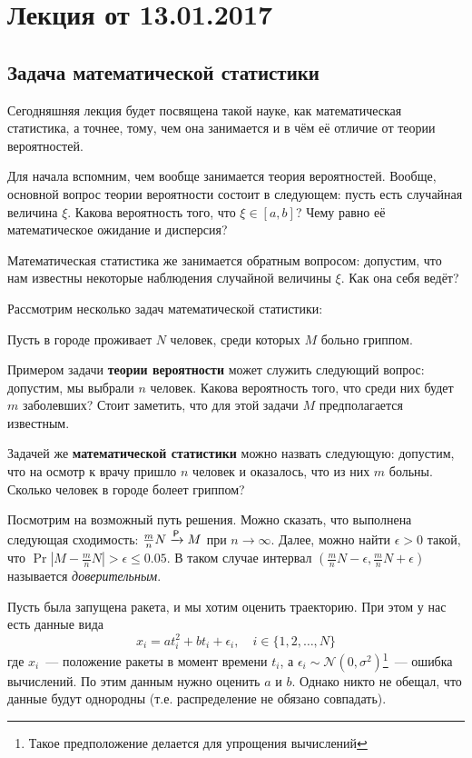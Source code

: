 \section{Лекция от 13.01.2017}
\subsection{Задача математической статистики}

Сегодняшняя лекция будет посвящена такой науке, как математическая статистика, 
а точнее, тому, чем она занимается и в чём её отличие от теории вероятностей. 

Для начала вспомним, чем вообще занимается теория вероятностей. Вообще, 
основной вопрос теории вероятности состоит в следующем: пусть есть случайная 
величина \(\xi\). Какова вероятность того, что \(\xi \in [a, b]\)? Чему равно 
её математическое ожидание и дисперсия?

Математическая статистика же занимается обратным вопросом: допустим, что нам 
известны некоторые наблюдения случайной величины \(\xi\). Как она себя ведёт?

Рассмотрим несколько задач математической статистики:

\begin{example}
	Пусть в городе проживает \(N\) человек, среди которых \(M\) больно гриппом. 
	
	Примером задачи \textbf{теории вероятности} может служить следующий вопрос: 
	допустим, мы выбрали \(n\) человек. Какова вероятность того, что среди них 
	будет \(m\) заболевших? Стоит заметить, что для этой задачи \(M\) 
	предполагается известным.
	
	Задачей же \textbf{математической статистики} можно назвать следующую: 
	допустим, что на осмотр к врачу пришло \(n\) человек и оказалось, что из 
	них \(m\) больны. Сколько человек в городе болеет гриппом?
	
	Посмотрим на возможный путь решения. Можно сказать, что выполнена следующая 
	сходимость: \(\frac{m}{n}N \prto M\) при \(n \to \infty\). Далее, можно 
	найти \(\epsilon > 0\) такой, что \(\Pr{|M - \frac{m}{n}N| >  \epsilon} 
	\leq 0.05\). В таком случае интервал \((\frac{m}{n}N - \epsilon,  
	\frac{m}{n}N + \epsilon)\) называется \emph{доверительным}.
\end{example}

\begin{example}
	Пусть была запущена ракета, и мы хотим оценить траекторию. При этом у нас 
	есть данные вида
	\[
		x_{i} = at_{i}^{2} + bt_{i} + \epsilon_{i},\quad i \in \{1, 2, \dots, 
		N\}
	\]
	где \(x_{i}\)~--- положение ракеты в момент времени \(t_{i}\), а 
	\(\epsilon_{i} \sim \mathcal{N}(0, \sigma^2)\)\footnote{Такое предположение 
	делается для упрощения вычислений}~--- ошибка вычислений. По этим данным 
	нужно оценить \(a\) и \(b\). Однако никто не обещал, что данные будут 
	однородны (т.е. распределение не обязано совпадать).
\end{example}

